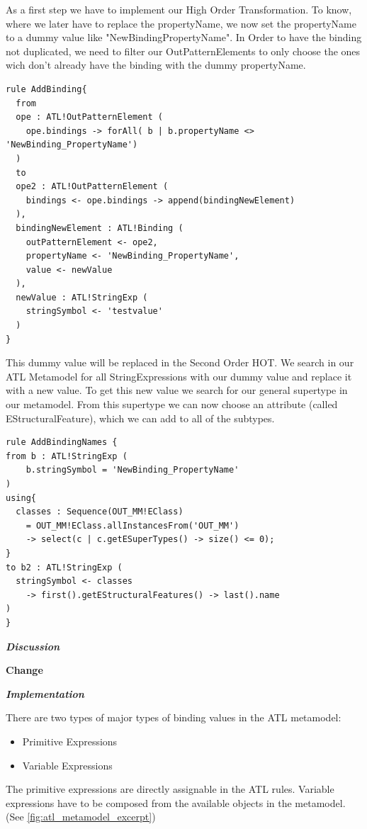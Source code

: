 \documentclass{llncs}
\begin{document}
As a first step we have to implement our High Order Transformation. To know, where we later have to replace the propertyName, we now set the propertyName to a dummy value like "NewBindingPropertyName".
In Order to have the binding not duplicated, we need to filter our OutPatternElements to only choose the ones wich don't already have the binding with the dummy propertyName.

\begin{lstlisting}
rule AddBinding{
  from 
  ope : ATL!OutPatternElement ( 
    ope.bindings -> forAll( b | b.propertyName <> 'NewBinding_PropertyName')
  )
  to
  ope2 : ATL!OutPatternElement (
    bindings <- ope.bindings -> append(bindingNewElement)
  ), 
  bindingNewElement : ATL!Binding (
    outPatternElement <- ope2,
    propertyName <- 'NewBinding_PropertyName',
    value <- newValue	
  ),
  newValue : ATL!StringExp (
    stringSymbol <- 'testvalue'
  )	
}
\end{lstlisting}

This dummy value will be replaced in the Second Order HOT.
We search in our ATL Metamodel for all StringExpressions with our dummy value and replace it with a new value.
To get this new value we search for our general supertype in our metamodel. From this supertype we can now choose an attribute (called EStructuralFeature), which we can add to all of the subtypes.

\begin{lstlisting}
rule AddBindingNames {
from b : ATL!StringExp (
    b.stringSymbol = 'NewBinding_PropertyName'
)
using{
  classes : Sequence(OUT_MM!EClass) 
	= OUT_MM!EClass.allInstancesFrom('OUT_MM') 
	-> select(c | c.getESuperTypes() -> size() <= 0);
}
to b2 : ATL!StringExp ( 
  stringSymbol <- classes 
	-> first().getEStructuralFeatures() -> last().name
)	
}
\end{lstlisting}

\textbf\textit{{Discussion}}

\textbf{Change}

\textbf\textit{{Implementation}}

There are two types of major types of binding values in the ATL metamodel:

\begin{itemize}
	\item Primitive Expressions
	\item Variable Expressions
\end{itemize}

The primitive expressions are directly assignable in the ATL rules. Variable expressions have to be composed from the available objects in the metamodel. (See \ref{fig:atl_metamodel_excerpt})
\end{document}
